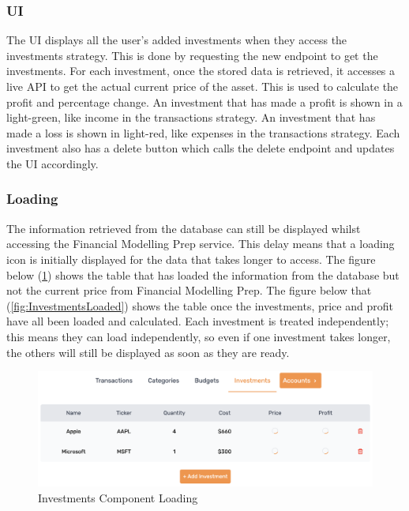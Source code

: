 \subsubsection{UI}
The UI displays all the user's added investments when they access the investments strategy. This is done by requesting the new endpoint to get the investments. For each investment, once the stored data is retrieved, it accesses a live API to get the actual current price of the asset. This is used to calculate the profit and percentage change. An investment that has made a profit is shown in a light-green, like income in the transactions strategy. An investment that has made a loss is shown in light-red, like expenses in the transactions strategy. Each investment also has a delete button which calls the delete endpoint and updates the UI accordingly.

\subsubsection{Loading}
The information retrieved from the database can still be displayed whilst accessing the Financial Modelling Prep service. This delay means that a loading icon is initially displayed for the data that takes longer to access. The figure below (\ref{fig:InvestmentsLoading}) shows the table that has loaded the information from the database but not the current price from Financial Modelling Prep. The figure below that (\ref{fig:InvestmentsLoaded}) shows the table once the investments, price and profit have all been loaded and calculated. Each investment is treated independently; this means they can load independently, so even if one investment takes longer, the others will still be displayed as soon as they are ready.

\vspace{\baselineskip}

\begin{figure}[H]
	\centering
	\includegraphics[width=\textwidth]{images/investments_loading.png}
	\caption{Investments Component Loading}
	\label{fig:InvestmentsLoading}
\end{figure}

